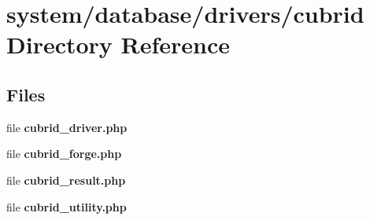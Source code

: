 \section{system/database/drivers/cubrid Directory Reference}
\label{dir_ef7236c450393c91e55f483d00ba69c1}
\subsection*{Files}
\begin{DoxyCompactItemize}
\item 
file {\bf cubrid\-\_\-driver.\-php}
\item 
file {\bf cubrid\-\_\-forge.\-php}
\item 
file {\bf cubrid\-\_\-result.\-php}
\item 
file {\bf cubrid\-\_\-utility.\-php}
\end{DoxyCompactItemize}
